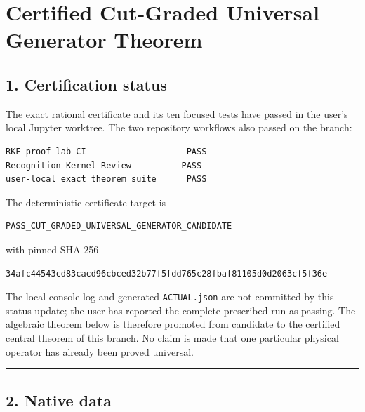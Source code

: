 \hypertarget{certified-cut-graded-universal-generator-theorem}{%
\chapter{Certified Cut-Graded Universal Generator Theorem}\label{certified-cut-graded-universal-generator-theorem}}

\hypertarget{certification-status}{%
\section{1. Certification status}\label{certification-status}}

The exact rational certificate and its ten focused tests have passed in the
user's local Jupyter worktree. The two repository workflows also passed on the
branch:

\begin{verbatim}
RKF proof-lab CI                    PASS
Recognition Kernel Review          PASS
user-local exact theorem suite      PASS
\end{verbatim}

The deterministic certificate target is

\begin{verbatim}
PASS_CUT_GRADED_UNIVERSAL_GENERATOR_CANDIDATE
\end{verbatim}

with pinned SHA-256

\begin{verbatim}
34afc44543cd83cacd96cbced32b77f5fdd765c28fbaf81105d0d2063cf5f36e
\end{verbatim}

The local console log and generated \texttt{ACTUAL.json} are not committed by this
status update; the user has reported the complete prescribed run as passing.
The algebraic theorem below is therefore promoted from candidate to the
certified central theorem of this branch. No claim is made that one particular
physical operator has already been proved universal.

\begin{center}\rule{0.5\linewidth}{0.5pt}\end{center}

\hypertarget{native-data}{%
\section{2. Native data}\label{native-data}}


